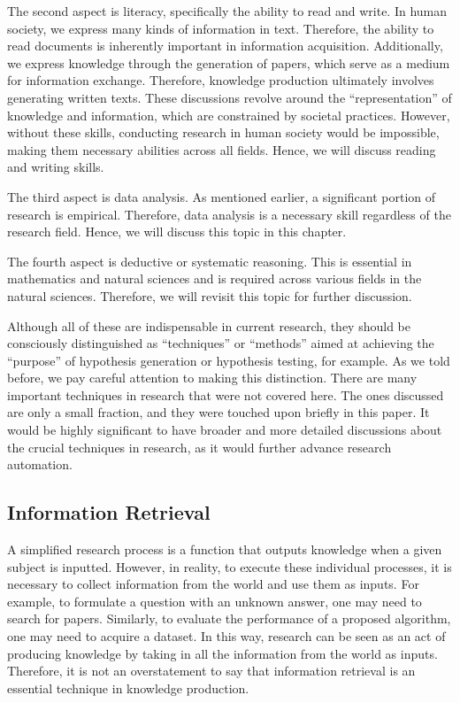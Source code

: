 \documentclass{book}
\begin{document}
The second aspect is literacy, specifically the ability to read and write. In human society, we express many kinds of information in text. Therefore, the ability to read documents is inherently important in information acquisition. Additionally, we express knowledge through the generation of papers, which serve as a medium for information exchange. Therefore, knowledge production ultimately involves generating written texts. These discussions revolve around the ``representation'' of knowledge and information, which are constrained by societal practices. However, without these skills, conducting research in human society would be impossible, making them necessary abilities across all fields. Hence, we will discuss reading and writing skills. 

The third aspect is data analysis. As mentioned earlier, a significant portion of research is empirical. Therefore, data analysis is a necessary skill regardless of the research field. Hence, we will discuss this topic in this chapter. 

The fourth aspect is deductive or systematic reasoning. This is essential in mathematics and natural sciences and is required across various fields in the natural sciences. Therefore, we will revisit this topic for further discussion. 

Although all of these are indispensable in current research, they should be consciously distinguished as ``techniques'' or ``methods'' aimed at achieving the ``purpose'' of hypothesis generation or hypothesis testing, for example. As we told before, we pay careful attention to making this distinction. There are many important techniques in research that were not covered here. The ones discussed are only a small fraction, and they were touched upon briefly in this paper. It would be highly significant to have broader and more detailed discussions about the crucial techniques in research, as it would further advance research automation.

\subsection{Information Retrieval}
A simplified research process is a function that outputs knowledge when a given subject is inputted. However, in reality, to execute these individual processes, it is necessary to collect information from the world and use them as inputs. For example, to formulate a question with an unknown answer, one may need to search for papers. Similarly, to evaluate the performance of a proposed algorithm, one may need to acquire a dataset. In this way, research can be seen as an act of producing knowledge by taking in all the information from the world as inputs. Therefore, it is not an overstatement to say that information retrieval is an essential technique in knowledge production. 
\end{document}
